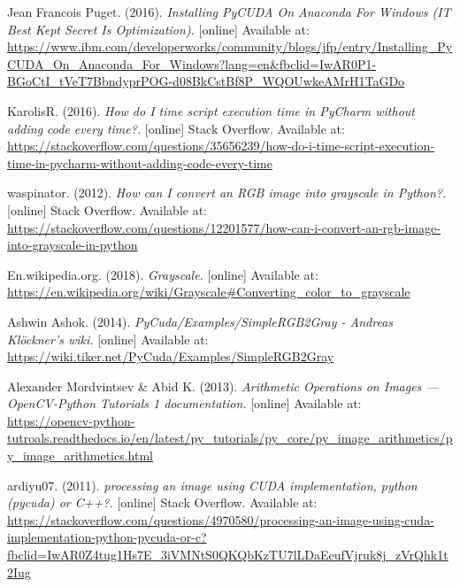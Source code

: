 \documentclass[11pt]{article}
\begin{document}
\newpage
\begin{thebibliography}{9}

Jean Francois Puget. (2016). \textit{Installing PyCUDA On Anaconda For Windows (IT Best Kept Secret Is Optimization).} [online] Available at:
\\\url{https://www.ibm.com/developerworks/community/blogs/jfp/entry/Installing_PyCUDA_On_Anaconda_For_Windows?lang=en&fbclid=IwAR0P1-BGoCtI_tVeT7BbndyprPOG-d08BkCstBf8P_WQOUwkeAMrH1TaGDo}

KarolisR. (2016). \textit{How do I time script execution time in PyCharm without adding code every time?.} [online] Stack Overflow. Available at:
\\\url{https://stackoverflow.com/questions/35656239/how-do-i-time-script-execution-time-in-pycharm-without-adding-code-every-time}

waspinator.  (2012). \textit{How can I convert an RGB image into grayscale in Python?.}  [online] Stack Overflow. Available at: 
\\\url{https://stackoverflow.com/questions/12201577/how-can-i-convert-an-rgb-image-into-grayscale-in-python}

En.wikipedia.org. (2018). \textit{Grayscale.} [online] Available at:
\\\url{https://en.wikipedia.org/wiki/Grayscale#Converting_color_to_grayscale}

Ashwin Ashok. (2014). \textit{PyCuda/Examples/SimpleRGB2Gray - Andreas Klöckner's wiki.} [online] Available at:
\\\url{https://wiki.tiker.net/PyCuda/Examples/SimpleRGB2Gray}

Alexander Mordvintsev \& Abid K. (2013). \textit{Arithmetic Operations on Images — OpenCV-Python Tutorials 1 documentation.} [online] Available at:
\\\url{https://opencv-python-tutroals.readthedocs.io/en/latest/py_tutorials/py_core/py_image_arithmetics/py_image_arithmetics.html}

ardiyu07. (2011). \textit{processing an image using CUDA implementation, python (pycuda) or C++?.} [online] Stack Overflow. Available at:
\\\url{https://stackoverflow.com/questions/4970580/processing-an-image-using-cuda-implementation-python-pycuda-or-c?fbclid=IwAR0Z4tug1Hs7E_3iVMNtS0QKQbKzTU7lLDaEeufVjruk8j_zVrQhk1t2Iug}

\end{thebibliography}
\end{document}
